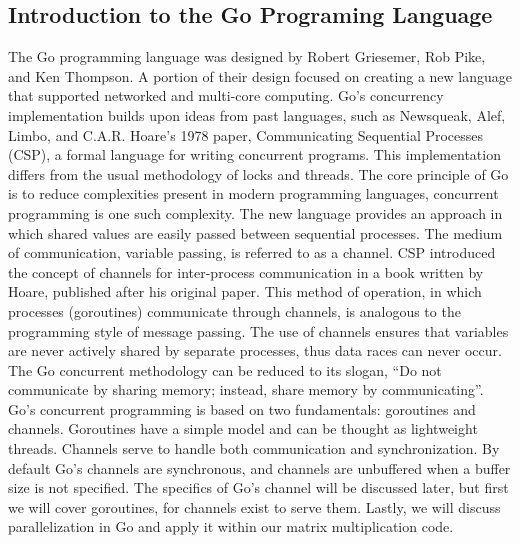 \subsection{Introduction to the Go Programing Language}
	The Go programming language was designed by Robert Griesemer, Rob Pike, and Ken Thompson. A portion of their design focused on creating a new language that supported networked and multi-core computing. Go’s concurrency implementation builds upon ideas from past languages, such as Newsqueak, Alef, Limbo, and C.A.R. Hoare’s 1978 paper, Communicating Sequential Processes (CSP), a formal language for writing concurrent programs. \cite{prell:hal-00718924} This implementation differs from the usual methodology of locks and threads.
	The core principle of Go is to reduce complexities present in modern programming languages, concurrent programming is one such complexity. The new language provides an approach in which shared values are easily passed between sequential processes. The medium of communication, variable passing, is referred to as a channel. CSP introduced the concept of channels for inter-process communication in a book written by Hoare, published after his original paper. This method of operation, in which processes (goroutines) communicate through channels, is analogous to the programming style of message passing. The use of channels ensures that variables are never actively shared by separate processes, thus data races can never occur. The Go concurrent methodology can be reduced to its slogan, “Do not communicate by sharing memory; instead, share memory by communicating”. \cite{website:go-lang-documentation}
	Go’s concurrent programming is based on two fundamentals: goroutines and channels. Goroutines have a simple model and can be thought as lightweight threads. Channels serve to handle both communication and synchronization. By default Go’s channels are synchronous, and channels are unbuffered when a buffer size is not specified. \cite{prell:hal-00718924} The specifics of Go’s channel will be discussed later, but first we will cover goroutines, for channels exist to serve them. Lastly, we will discuss parallelization in Go and apply it within our matrix multiplication code.
